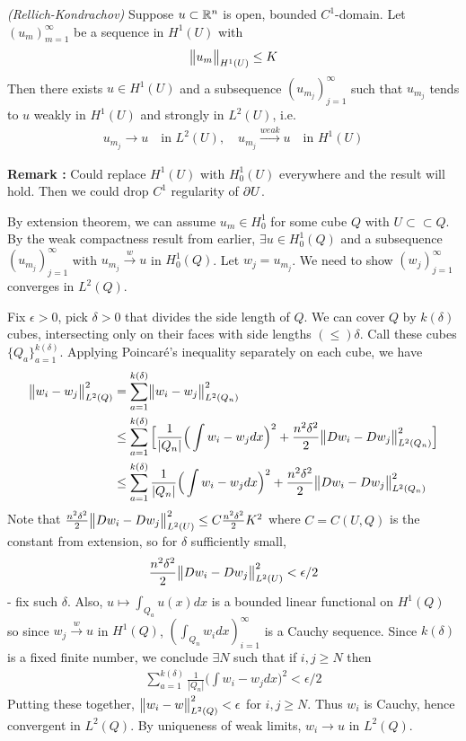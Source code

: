 \documentclass[12pt,a4paper]{report}
\newenvironment{proof}
{\begin{changemargin}{1cm}{0.5cm} 
	}%
	{\end{changemargin}
}
\begin{document}
\thm \emph{(Rellich-Kondrachov)} Suppose $u \subset \mathbb{R}^n$ is open, bounded $C^1$-domain. Let $(u_m)_{m=1}^{\infty}$ be a sequence in $H^1(U)$ with
\begin{align*}
\bigl\lVert u_m\bigr\rVert_{H^1(U)} \leq K
\end{align*}
Then there exists $u\in H^1(U)$ and a subsequence $(u_{m_j})_{j=1}^{\infty}$ such that $u_{m_j}$ tends to $u$ weakly in $H^1(U)$ and strongly in $L^2(U)$, i.e.
\begin{align*}
u_{m_j} \rightarrow u \quad \text{in } L^2(U), \quad u_{m_j} \xrightarrow{weak} u \quad \text{in } H^1(U)
\end{align*}

\textbf{Remark :} Could replace $H^1(U)$ with $H_0^1(U)$ everywhere and the result will hold. Then we could drop $C^1$ regularity of $\partial U$. 
\begin{proof}
\pf By extension theorem, we can assume $u_m \in H_0^1$ for some cube $Q$ with $U \subset \subset Q$. By the weak compactness result from earlier, $\exists u\in H_0^1(Q)$ and a subsequence $(u_{m_j})_{j=1}^{\infty}$ with $u_{m_j} \xrightarrow{w} u$ in $H_0^1(Q)$. Let $w_j = u_{m_j}$. We need to show $(w_j)_{j=1}^{\infty}$ converges in $L^2(Q)$.

\quad Fix $\epsilon >0$, pick $\delta >0$ that divides the side length of $Q$. We can cover $Q$ by $k(\delta)$ cubes, intersecting only on their faces with side lengths $(\leq)\delta$. Call these cubes $\{Q_a \}_{a=1}^{k(\delta)}$. Applying Poincar\'{e}'s inequality separately on each cube, we have
\begin{align*}
\bigl\lVert w_i - w_j\bigr\rVert_{L^2(Q)}^2 &= \sum_{a=1}^{k(\delta)} \bigl\lVert w_i -w_j\bigr\rVert_{L^2(Q_n)}^2 \\
& \leq  \sum_{a=1}^{k(\delta)} \Big[ \frac{1}{|Q_n|} \Big( \int w_i - w_j dx\Big)^2 + \frac{n^2 \delta^2}{2} \bigl\lVert Dw_i -Dw_j\bigr\rVert_{L^2(Q_n)}^2\Big] \\
& \leq \sum_{a=1}^{k(\delta)} \frac{1}{|Q_n|} \Big( \int w_i - w_j dx\Big)^2 + \frac{n^2 \delta^2}{2} \bigl\lVert Dw_i -Dw_j\bigr\rVert_{L^2(Q_n)}^2
\end{align*}
Note that $\frac{n^2 \delta^2}{2} \bigl\lVert Dw_i - Dw_j\bigr\rVert_{L^2(U)}^2 \leq C \frac{n^2\delta^2}{2} K^2$ where $C = C(U,Q)$ is the constant from extension, so for $\delta$ sufficiently small, 
\begin{align*}
\frac{n^2 \delta^2}{2}\bigl\lVert Dw_i - Dw_j\bigr\rVert_{L^2(U)}^2 < \epsilon/2
\end{align*}
- fix such $\delta$. Also, $u \mapsto \int_{Q_a} u(x)dx$ is a bounded linear functional on $H^1(Q)$ so since $w_j \xrightarrow{w} u$ in $H^1(Q)$, $(\int_{Q_n} w_i dx)_{i=1}^{\infty}$ is a Cauchy sequence. Since $k(\delta)$ is a fixed finite number, we conclude $\exists N$ such that if $i,j\geq N$ then
\begin{align*}
\sum_{a=1}^{k(\delta)} \frac{1}{|Q_n|} \Big( \int w_i - w_j dx\Big)^2 < \epsilon/2
\end{align*}
Putting these together, $\bigl\lVert w_i -w\bigr\rVert_{L^2(Q)}^2 < \epsilon$ for $i,j\geq N$. Thus $w_i$ is Cauchy, hence convergent in $L^2(Q)$. By uniqueness of weak limits, $w_i \rightarrow u$ in $L^2(Q)$.

\eop
\end{proof}
\s
\end{document}
